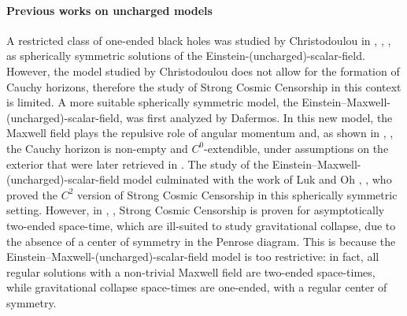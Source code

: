 \documentclass[10pt,a4paper]{article}
\theoremstyle{plain}
\theoremstyle{remark}
\theoremstyle{definition}
\theoremstyle{plain}
\theoremstyle{remark}
\theoremstyle{definition}
\numberwithin{equation}{section}
\begin{document}
 	\paragraph{Previous works on uncharged models} A restricted class of one-ended black holes was studied by Christodoulou in \cite{Christo1}, \cite{Christo2}, \cite{Christo3}, as spherically symmetric solutions of the Einstein-(uncharged)-scalar-field. However, the model studied by Christodoulou does not allow for the formation of Cauchy horizons, therefore the study of Strong Cosmic Censorship in this context is limited. A more suitable spherically symmetric model, the Einstein--Maxwell-(uncharged)-scalar-field, was first analyzed by Dafermos. In this new model, the Maxwell field plays the repulsive role of angular momentum and, as shown in \cite{MihalisPHD}, \cite{Mihalis1}, the Cauchy horizon is non-empty and $C^0$-extendible, under assumptions on the exterior that were later retrieved in \cite{PriceLaw}. The study of the Einstein--Maxwell-(uncharged)-scalar-field model culminated with the work of Luk and Oh \cite{JonathanStab}, \cite{JonathanStabExt}, who proved the $C^2$ version of Strong Cosmic Censorship in this spherically symmetric setting. However, in \cite{JonathanStab}, \cite{JonathanStabExt}, Strong Cosmic Censorship is proven for asymptotically two-ended space-time, which are ill-suited to study gravitational collapse, due to the absence of a center of symmetry in the Penrose diagram. This is because the Einstein--Maxwell-(uncharged)-scalar-field model is too restrictive: in fact, all regular solutions with a non-trivial Maxwell field are two-ended space-times, while gravitational collapse space-times are one-ended, with a regular center of symmetry.
\end{document}
